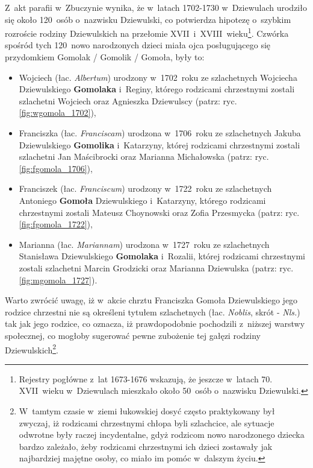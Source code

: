 Z~akt parafii w~Zbuczynie wynika, że w~latach 1702-1730 w~Dziewulach urodziło 
się około 120~osób o~nazwisku Dziewulski, co potwierdza hipotezę o~szybkim 
rozroście rodziny Dziewulskich na przełomie 
XVII~i~XVIII~wieku\footnote{Rejestry pogłówne z~lat 1673-1676 wskazują, że 
jeszcze w~latach 70. XVII~wieku w~Dziewulach mieszkało około 50~osób 
o~nazwisku Dziewulski.}. Czwórka spośród tych 120~nowo narodzonych dzieci 
miała ojca posługującego się przydomkiem Gomolak / Gomolik / Gomoła, były to:

\begin{itemize}
\item Wojciech (łac. \emph{Albertum}) urodzony w~1702~roku ze szlachetnych 
Wojciecha Dziewulskiego \textbf{Gomolaka} i~Reginy, którego rodzicami 
chrzestnymi zostali szlachetni Wojciech oraz Agnieszka Dziewulscy (patrz: 
ryc. \ref{fig:wgomola_1702}),
\item Franciszka (łac. \emph{Franciscam}) urodzona w~1706~roku ze 
szlachetnych Jakuba Dziewulskiego \textbf{Gomolika} i~Katarzyny, której 
rodzicami chrzestnymi zostali szlachetni Jan Maścibrocki oraz Marianna 
Michałowska (patrz: ryc. \ref{fig:fgomola_1706}),
\item Franciszek (łac. \emph{Franciscum}) urodzony w~1722~roku ze 
szlachetnych Antoniego \textbf{Gomoła} Dziewulskiego i~Katarzyny, którego 
rodzicami chrzestnymi zostali Mateusz Choynowski oraz Zofia Przesmycka 
(patrz: ryc. \ref{fig:fgomola_1722}),
\item Marianna (łac. \emph{Mariannam}) urodzona w~1727~roku ze szlachetnych 
Stanisława Dziewulskiego \textbf{Gomolaka} i~Rozalii, której rodzicami 
chrzestnymi zostali szlachetni Marcin Grodzicki oraz Marianna Dziewulska 
(patrz: ryc. \ref{fig:mgomola_1727}).
\end{itemize}

Warto zwrócić uwagę, iż w~akcie chrztu Franciszka Gomoła Dziewulskiego jego 
rodzice chrzestni nie są określeni tytułem szlachetnych (łac. \emph{Noblis}, 
skrót - \emph{Nls.}) tak jak jego rodzice, co oznacza, iż prawdopodobnie 
pochodzili z~niższej warstwy społecznej, co mogłoby sugerować pewne zubożenie 
tej gałęzi rodziny Dziewulskich\footnote{W~tamtym czasie w~ziemi łukowskiej 
dosyć często praktykowany był zwyczaj, iż rodzicami chrzestnymi chłopa byli 
szlachcice, ale sytuacje odwrotne były raczej incydentalne, gdyż rodzicom 
nowo narodzonego dziecka bardzo zależało, żeby rodzicami chrzestnymi ich 
dzieci zostawały jak najbardziej majętne osoby, co miało im pomóc w~dalszym 
życiu.}. 

